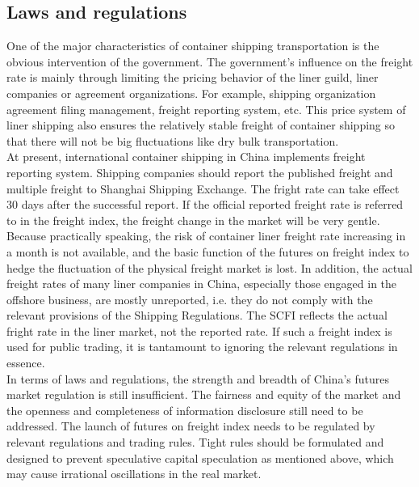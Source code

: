 \documentclass{aas}
\begin{document}
\begin{multicols}{2}
	\subsection{Laws and regulations}

	One of the major characteristics of container shipping transportation is the obvious intervention of the government. The government's influence on the freight rate is mainly through limiting the pricing behavior of the liner guild, liner companies or agreement organizations. For example, shipping organization agreement filing management, freight reporting system, etc. This price system of liner shipping also ensures the relatively stable freight of container shipping so that there will not be big fluctuations like dry bulk transportation. \\

	At present, international container shipping in China implements freight reporting system. Shipping companies should report the published freight and multiple freight to Shanghai Shipping Exchange. The fright rate can take effect 30 days after the successful report. If the official reported freight rate is referred to in the freight index, the freight change in the market will be very gentle. Because practically speaking, the risk of container liner freight rate increasing in a month is not available, and the basic function of the futures on freight index to hedge the fluctuation of the physical freight market is lost. In addition, the actual freight rates of many liner companies in China, especially those engaged in the offshore business, are mostly unreported, i.e. they do not comply with the relevant provisions of the Shipping Regulations. The SCFI reflects the actual fright rate in the liner market, not the reported rate. If such a freight index is used for public trading, it is tantamount to ignoring the relevant regulations in essence. \\

	In terms of laws and regulations, the strength and breadth of China's futures market regulation is still insufficient. The fairness and equity of the market and the openness and completeness of information disclosure still need to be addressed. The launch of futures on freight index needs to be regulated by relevant regulations and trading rules. Tight rules should be formulated and designed to prevent speculative capital speculation as mentioned above, which may cause irrational oscillations in the real market. \\


\end{multicols}
\end{document}
